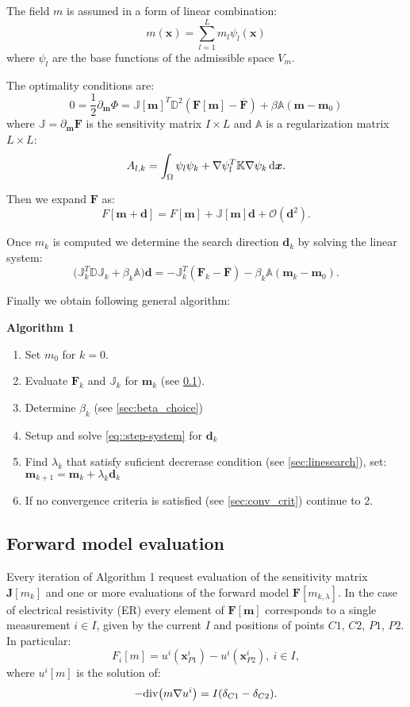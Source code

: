 \documentclass[a4paper, 12pt]{book}
\theoremstyle{definition}
\def\div{{\rm div}}
\def\grad{\nabla}
\def\d{\,{\rm d}}               %
\def\vc#1{\mathbf{\boldsymbol{#1}}}     %
\def\tn#1{{\mathbb{#1}}}    %
\def\prtl{\partial}                                        %
\begin{document}
The field $m$ is assumed in a form of linear combination: 
\[
    m(\vc x) = \sum_{l=1}^L m_l \psi_l(\vc x)
\]
where $\psi_l$ are the base functions of the admissible space  $V_{m}$. 

The optimality conditions are:
\[
   0  = \frac12\prtl_{\vc m} \Phi = \tn J[\vc m]^T \tn D^2 (\vc F[\vc m] - \overline{\vc F}) + \beta \tn A (\vc m - \vc m_0) 
\]
where $\tn J=\prtl_{\vc m} \vc F$ is the sensitivity matrix $I\times L$ and $\tn A$ is a regularization matrix $L\times L$:
\[
   A_{l, k} = \int_\Omega \psi_l \psi_k + \grad \psi_l^T \tn K \grad \psi_k \d \vc x.
\]


Then we expand $\vc F$ as:
\[
    F[\vc m  + \vc d] = F[\vc m] + \tn J[\vc m] \vc d + \mathcal O(\vc d^2).
\]

Once $m_k$ is computed we determine the search direction $\vc d_{k}$ by solving the linear system:
\begin{equation}
   \label{eq::step-system}
   \Big(\tn J_k^T \tn D \tn J_k + \beta_k \tn A \Big) \vc d =
   -\tn J_k^T(\vc F_k - \overline{\vc F}) - \beta_k \tn A (\vc m_k - \vc m_0).
\end{equation}

Finally we obtain following general algorithm:

{\bf Algorithm 1}
\begin{enumerate}
 \item Set $m_0$ for $k=0$.
 \item Evaluate $\vc F_k$ and $\tn J_k$ for $\vc m_k$ (see \ref{sec:evaluation}).
 \item Determine $\beta_k$ (see \ref{sec:beta_choice})
 \item Setup and solve \eqref{eq::step-system} for $\vc d_k$
 \item Find $\lambda_k$ that satisfy suficient decrerase condition (see \ref{sec:linesearch}), set:
    $\vc m_{k+1} = \vc m_k + \lambda_k \vc d_k$        
 \item If no convergence criteria is satisfied (see \ref{sec:conv_crit}) continue to 2.
\end{enumerate}

\subsection{Forward model evaluation}
\label{sec:evaluation}
Every iteration of Algorithm 1 request evaluation of the sensitivity matrix $\vc J[m_k]$ and one or more evaluations of 
the forward model $\vc F[m_{k,\lambda}]$. In the case of electrical resistivity (ER) every element of $\vc F[\vc m]$ 
corresponds to a single measurement $i \in I$, given by the current $I$ and positions of points $C1$, $C2$, $P1$, $P2$. 
In particular:
\[
    F_i[m] = u^i(\vc x^i_{P1}) - u^i(\vc x^i_{P2}),\ i\in I,
\]
where $u^i[m]$ is the solution of:
\[
  -\div \big(m \grad u^i \big) = I (\delta_{C1} - \delta_{C2}).
\]
\end{document}
